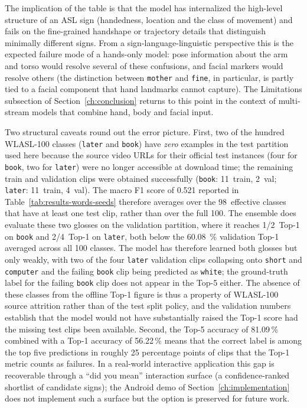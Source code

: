The implication of the table is that the model has internalized the
high-level structure of an ASL sign (handedness, location and the
class of movement) and fails on the fine-grained handshape or
trajectory details that distinguish minimally different signs. From a
sign-language-linguistic perspective this is the expected failure
mode of a hands-only model: pose information about the arm and torso
would resolve several of these confusions, and facial markers would
resolve others (the distinction between \texttt{mother} and
\texttt{fine}, in particular, is partly tied to a facial component
that hand landmarks cannot capture). The Limitations subsection of
Section~\ref{ch:conclusion} returns to this point in the context of
multi-stream models that combine hand, body and facial input.

Two structural caveats round out the error picture. First, two of the
hundred WLASL-100 classes (\texttt{later} and \texttt{book}) have
\emph{zero} examples in the test partition used here because the
source video URLs for their official test instances (four for
\texttt{book}, two for \texttt{later}) were no longer accessible at
download time; the remaining train and validation clips were obtained
successfully (\texttt{book}: 11~train, 2~val; \texttt{later}:
11~train, 4~val). The macro F1 score of 0.521 reported in
Table~\ref{tab:results-words-seeds} therefore averages over the
98~effective classes that have at least one test clip, rather than
over the full 100. The ensemble does evaluate these two glosses on the
validation partition, where it reaches 1/2~Top-1 on \texttt{book} and
2/4~Top-1 on \texttt{later}, both below the \SI{60.08}{\percent}
validation Top-1 averaged across all 100 classes. The model has
therefore learned both glosses but only weakly, with two of the four
\texttt{later} validation clips collapsing onto \texttt{short} and
\texttt{computer} and the failing \texttt{book} clip being predicted
as \texttt{white}; the ground-truth label for the failing \texttt{book}
clip does not appear in the Top-5 either. The absence of these classes
from the offline Top-1 figure is thus a property of WLASL-100 source
attrition rather than of the test split policy, and the validation
numbers establish that the model would not have substantially raised
the Top-1 score had the missing test clips been available. Second, the Top-5 accuracy of 81.09\,\%
combined with a Top-1 accuracy of 56.22\,\% means that the correct
label is among the top five predictions in roughly 25 percentage
points of clips that the Top-1 metric counts as failures. In a
real-world interactive application this gap is recoverable through a
``did you mean'' interaction surface (a confidence-ranked shortlist of
candidate signs); the Android demo of Section~\ref{ch:implementation}
does not implement such a surface but the option is preserved for
future work.

